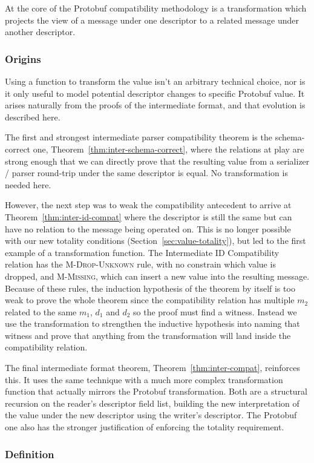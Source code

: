 At the core of the Protobuf compatibility methodology is a transformation which
projects the view of a message under one descriptor to a related message under
another descriptor.

\subsubsection{Origins}

Using a function to transform the value isn't an arbitrary technical choice, nor
is it only useful to model potential descriptor changes to specific Protobuf
value. It arises naturally from the proofs of the intermediate format, and that
evolution is described here.

The first and strongest intermediate parser compatibility theorem is the
schema-correct one, Theorem~\ref{thm:inter-schema-correct}, where the relations
at play are strong enough that we can directly prove that the resulting value
from a serializer / parser round-trip under the same descriptor is equal. No
transformation is needed here.

However, the next step was to weak the compatibility antecedent to arrive at
Theorem~\ref{thm:inter-id-compat} where the descriptor is still the same but can
have no relation to the message being operated on. This is no longer possible
with our new totality conditions (Section~\ref{sec:value-totality}), but led to
the first example of a transformation function. The Intermediate ID
Compatibility relation has the \textsc{M-Drop-Unknown} rule, with no constrain
which value is dropped, and \textsc{M-Missing}, which can insert a new value
into the resulting message. Because of these rules, the induction hypothesis of
the theorem by itself is too weak to prove the whole theorem since the
compatibility relation has multiple $m_2$ related to the same $m_1$, $d_1$ and
$d_2$ so the proof must find a witness. Instead we use the transformation to
strengthen the inductive hypothesis into naming that witness and prove that
anything from the transformation will land inside the compatibility relation.

The final intermediate format theorem, Theorem~\ref{thm:inter-compat},
reinforces this. It uses the same technique with a much more complex
transformation function that actually mirrors the Protobuf transformation. Both
are a structural recursion on the reader's descriptor field list, building the
new interpretation of the value under the new descriptor using the writer's
descriptor. The Protobuf one also has the stronger justification of enforcing
the totality requirement.

\subsubsection{Definition}

